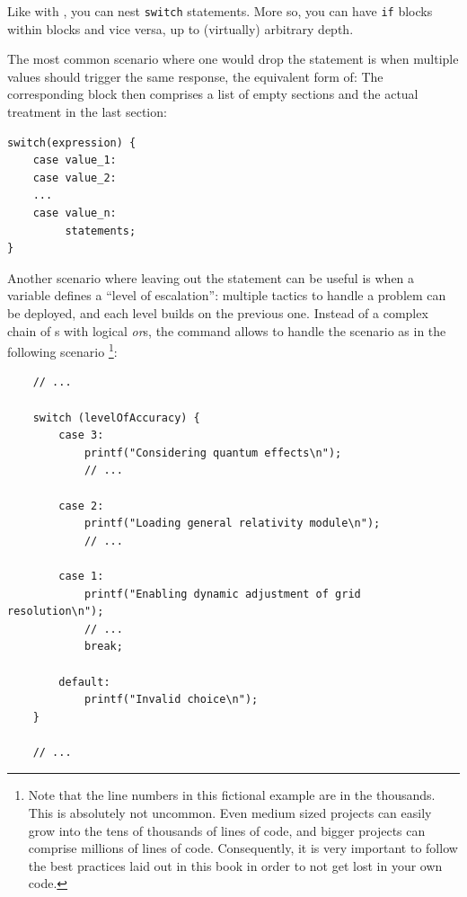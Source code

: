 Like with , you can nest \texttt{switch} statements. More so, you can have \texttt{if} blocks within  blocks and vice versa, up to (virtually) arbitrary depth.

The most common scenario where one would drop the  statement is when multiple values should trigger the same response, \ie the equivalent form of:
The corresponding  block then comprises a list of empty  sections and the actual treatment in the last section:
\begin{verbatim}
switch(expression) {
    case value_1:
    case value_2:
    ...
    case value_n:    
         statements;
}
\end{verbatim}

Another scenario where leaving out the  statement can be useful is when a variable defines a \enquote{level of escalation}: multiple tactics to handle a problem can be deployed, and each level builds on the previous one. Instead of a complex chain of s with logical \emph{or}s, the  command allows to handle the scenario as in the following scenario
\footnote{Note that the line numbers in this fictional example are in the thousands. This is absolutely not uncommon. Even medium sized projects can easily grow into the tens of thousands of lines of code, and bigger projects can comprise millions of lines of code. Consequently, it is very important to follow the best practices laid out in this book in order to not get lost in your own code.}:
\begin{codebox}[levelOfAccuracy.c, leftupper=9mm]
\begin{verbatim}
    // ...
    
    switch (levelOfAccuracy) {
        case 3:
            printf("Considering quantum effects\n");
            // ...
        
        case 2:
            printf("Loading general relativity module\n");
            // ...
            
        case 1:
            printf("Enabling dynamic adjustment of grid resolution\n");
            // ...
            break;
            
        default:
            printf("Invalid choice\n");
    }
    
    // ...
\end{verbatim}
 \label{code:levelsOfAccuracy}
\end{codebox}

